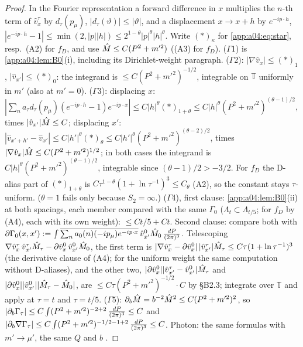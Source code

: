 \begin{proof}
In the Fourier representation a forward difference in $x$ multiplies the $n$-th term of $\hat v^\tau_x$ by $d_\tau(p_\mu)$, $|d_\tau(\vartheta)|\le|\vartheta|$, and a displacement $x\to x+h$ by $e^{-ip\cdot h}$, $|e^{-ip\cdot h}-1|\le\min(2,|p||h|)\le2^{1-\theta}|p|^\theta|h|^\theta$. Write $(*)_\kappa$ for \eqref{app:a04:eq:star}, resp.\ (A2) for $f_D$, and use $\hat M\le C(P^2+m'^2)$ ((A3) for $f_D$).
($\Gamma$1) is \cref{app:a04:lem:B0}(i), including its Dirichlet-weight paragraph.
($\Gamma$2): $|\nabla\hat v_x|\le(*)_1$, $|\hat v_{x'}|\le(*)_0$: the integrand is $\le C(P^2+m'^2)^{-1/2}$, integrable on $\mathbb T$ uniformly in $m'$ (also at $m'=0$).
($\Gamma$3): displacing $x$: $|\sum_na_\tau d_\tau(p_\mu)(e^{-ip\cdot h}-1)e^{-ip\cdot x}|\le C|h|^\theta(*)_{1+\theta}\le C|h|^\theta(P^2+m'^2)^{(\theta-1)/2}$, times $|\hat v_{x'}|\hat M\le C$; displacing $x'$: $|\hat v_{x'+h'}-\hat v_{x'}|\le C|h'|^\theta(*)_\theta\le C|h'|^\theta(P^2+m'^2)^{(\theta-2)/2}$, times $|\nabla\hat v_x|\hat M\le C(P^2+m'^2)^{1/2}$; in both cases the integrand is $C|h|^\theta(P^2+m'^2)^{(\theta-1)/2}$, integrable since $(\theta-1)/2>-3/2$. For $f_D$ the D-alias part of $(*)_{1+\theta}$ is $C\tau^{1-\theta}(1+\ln\tau^{-1})^3\le C_\theta$ (A2), so the constant stays $\tau$-uniform. ($\theta=1$ fails only because $S_2=\infty$.)
($\Gamma$4), first clause: \cref{app:a04:lem:B0}(ii) at both spacings, each member compared with the same $\Gamma_0$ ($\Lambda_t\subset\Lambda_{t/5}$; for $f_D$ by (A4), each with its own weight): $\le Ct/5+Ct$. Second clause: compare both with $\partial\Gamma_0(x,x'):=\int\overline{\sum_na_0(n)(-ip_\mu)e^{-ip\cdot x}}\,\hat v^0_{x'}\hat M_0\,\tfrac{dP}{(2\pi)^3}$. Telescoping $\nabla\hat v^\tau_x\,\hat v^\tau_{x'}\hat M_\tau-\partial\hat v^0_x\,\hat v^0_{x'}\hat M_0$, the first term is $|\nabla\hat v^\tau_x-\partial\hat v^0_x|\,|\hat v^\tau_{x'}|\hat M_\tau\le C\tau(1+\ln\tau^{-1})^3$ (the derivative clause of (A4); for the uniform weight the same computation without D-aliases), and the other two, $|\partial\hat v^0_x||\hat v^\tau_{x'}-\hat v^0_{x'}|\hat M_\tau$ and $|\partial\hat v^0_x||\hat v^0_{x'}||\hat M_\tau-\hat M_0|$, are $\le C\tau(P^2+m'^2)^{-1/2}\cdot C$ by \S B2.3; integrate over $\mathbb T$ and apply at $\tau=t$ and $\tau=t/5$.
($\Gamma$5): $\partial_b\hat M=b^{-2}\hat M^2\le C(P^2+m'^2)^2$, so $|\partial_b\Gamma_\tau|\le C\int(P^2+m'^2)^{-2+2}\,\tfrac{dP}{(2\pi)^3}\le C$ and $|\partial_b\nabla\Gamma_\tau|\le C\int(P^2+m'^2)^{-1/2-1+2}\,\tfrac{dP}{(2\pi)^3}\le C$.
Photon: the same formulas with $m'\to\mu'$, the same $Q$ and $b$ \cite[(2.16)--(2.17)]{K1}.
\end{proof}

